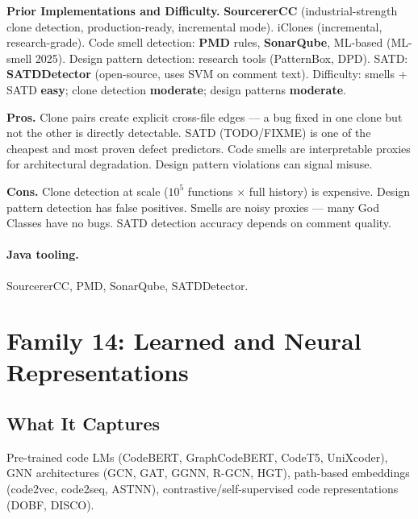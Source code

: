 \documentclass[12pt,a4paper]{article}
\begin{document}
\begin{implbox}
\textbf{Prior Implementations and Difficulty.}
\textbf{SourcererCC} (industrial-strength clone detection, production-ready,
incremental mode). iClones (incremental, research-grade). Code smell detection:
\textbf{PMD} rules, \textbf{SonarQube}, ML-based (ML-smell 2025). Design pattern
detection: research tools (PatternBox, DPD). SATD: \textbf{SATDDetector}
(open-source, uses SVM on comment text). Difficulty: smells + SATD
\textbf{easy}; clone detection \textbf{moderate}; design patterns
\textbf{moderate}.
\end{implbox}

\begin{prosbox}
\textbf{Pros.}
Clone pairs create explicit cross-file edges --- a bug fixed in one clone but
not the other is directly detectable. SATD (TODO/FIXME) is one of the cheapest
and most proven defect predictors. Code smells are interpretable proxies for
architectural degradation. Design pattern violations can signal misuse.
\end{prosbox}

\begin{consbox}
\textbf{Cons.}
Clone detection at scale ($10^5$ functions $\times$ full history) is expensive.
Design pattern detection has false positives. Smells are noisy proxies --- many
God Classes have no bugs. SATD detection accuracy depends on comment quality.
\end{consbox}

\paragraph{Java tooling.} SourcererCC, PMD, SonarQube, SATDDetector.

\section{Family 14: Learned and Neural Representations}

\subsection{What It Captures}

Pre-trained code LMs (CodeBERT, GraphCodeBERT, CodeT5, UniXcoder), GNN
architectures (GCN, GAT, GGNN, R-GCN, HGT), path-based embeddings (code2vec,
code2seq, ASTNN), contrastive/self-supervised code representations (DOBF,
DISCO).
\end{document}
